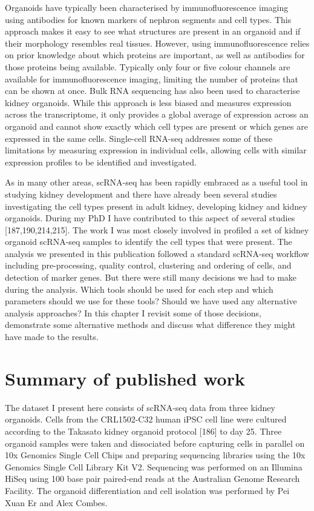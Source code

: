 \documentclass[11pt,a4paper,titlepage,twoside,openright]{style/unimelbthesis}
\theoremstyle{definition}
\theoremstyle{definition}
\theoremstyle{definition}
\theoremstyle{remark}
\begin{document}
\begin{mainmatter}
Organoids have typically been characterised by immunofluorescence imaging using antibodies for known markers of nephron segments and cell types. This approach makes it easy to see what structures are present in an organoid and if their morphology resembles real tissues. However, using immunofluorescence relies on prior knowledge about which proteins are important, as well as antibodies for those proteins being available. Typically only four or five colour channels are available for immunofluorescence imaging, limiting the number of proteins that can be shown at once. Bulk RNA sequencing has also been used to characterise kidney organoids. While this approach is less biased and measures expression across the transcriptome, it only provides a global average of expression across an organoid and cannot show exactly which cell types are present or which genes are expressed in the same cells. Single-cell RNA-seq addresses some of these limitations by measuring expression in individual cells, allowing cells with similar expression profiles to be identified and investigated.

As in many other areas, scRNA-seq has been rapidly embraced as a useful tool in studying kidney development and there have already been several studies investigating the cell types present in adult kidney, developing kidney and kidney organoids. During my PhD I have contributed to this aspect of several studies {[}187,190,214,215{]}. The work I was most closely involved in profiled a set of kidney organoid scRNA-seq samples to identify the cell types that were present. The analysis we presented in this publication followed a standard scRNA-seq workflow including pre-processing, quality control, clustering and ordering of cells, and detection of marker genes. But there were still many decisions we had to make during the analysis. Which tools should be used for each step and which parameters should we use for these tools? Should we have used any alternative analysis approaches? In this chapter I revisit some of those decisions, demonstrate some alternative methods and discuss what difference they might have made to the results.

\hypertarget{summary-of-published-work}{%
\section{Summary of published work}\label{summary-of-published-work}}

The dataset I present here consists of scRNA-seq data from three kidney organoids. Cells from the CRL1502-C32 human iPSC cell line were cultured according to the Takasato kidney organoid protocol {[}186{]} to day 25. Three organoid samples were taken and dissociated before capturing cells in parallel on 10x Genomics Single Cell Chips and preparing sequencing libraries using the 10x Genomics Single Cell Library Kit V2. Sequencing was performed on an Illumina HiSeq using 100 base pair paired-end reads at the Australian Genome Research Facility. The organoid differentiation and cell isolation was performed by Pei Xuan Er and Alex Combes.


\end{mainmatter}
\end{document}
